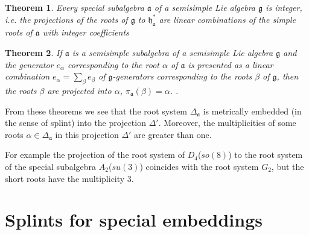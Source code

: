 \documentclass[12pt]{article}
\newtheorem{theorem}{Theorem}
\newcommand{\pia}{\pi_{\mathfrak{a}}}
\newcommand{\gf}{\mathfrak{g}}
\newcommand{\af}{\mathfrak{a}}
\newcommand{\hf}{\mathfrak{h}}
\newcommand{\hfa}{\hf_{\af}}
\begin{document}
\begin{theorem}\label{dyn1}
  Every special subalgebra $\af$ of a semisimple Lie algebra $\gf$ is integer, i.e. the projections of
  the roots of $\gf$ to $\hfa^{*}$ are linear combinations of the simple roots of $\af$ with integer
  coefficients \cite{dynkin1952semisimple}
\end{theorem}

\begin{theorem}\label{dyn2}
  If $\af$  is a semisimple subalgebra of a semisimple Lie algebra $\gf$ and the generator $e_{\alpha}$ corresponding to
  the root $\alpha$ of $\af$ is presented as a linear combination $e_{\alpha}=\sum_{\beta}
  e_{\beta}$ of $\gf$-generators
  corresponding to the roots $\beta$ of $\gf$, then the roots $\beta$ are projected into $\alpha$,
  $\pia(\beta)=\alpha$. 
  \cite{dynkin1972semisimple,dynkin1952semisimple}. 
\end{theorem}

From these theorems we see that the root system $\Delta_{\af}$ is metrically embedded (in the sense
of splint) into the projection $\Delta'$. Moreover, the multiplicities of some roots
$\alpha\in\Delta_{\af}$ in this projection $\Delta'$ are greater than one. 

For example the projection of the root system of $D_{4}$($so(8)$) to the root system of the special
subalgebra $A_{2}$($su(3)$) coincides with the root system $G_{2}$, but the short roots have the multiplicity $3$.



\section{Splints for special embeddings}
\label{sec:splints-spec-embedd}

\end{document}
